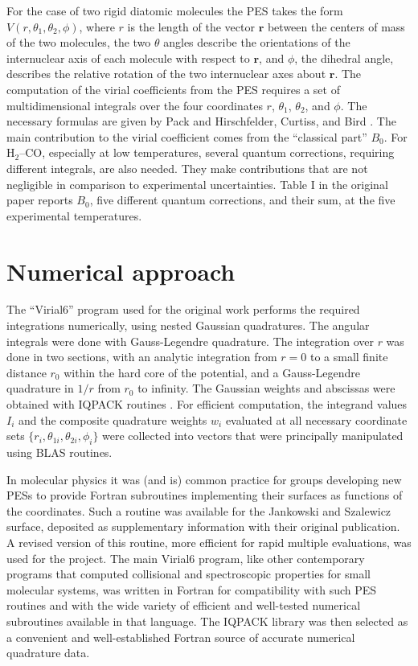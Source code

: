 For the case of two rigid diatomic molecules the PES takes the form $V(r,\theta_1, \theta_2, \phi)$, where $r$ is the length of the vector $\mathbf{r}$ between the centers of mass of the two molecules, the two $\theta$ angles describe the orientations of the internuclear axis of each molecule with respect to $\mathbf{r}$, and $\phi$, the dihedral angle, describes the relative rotation of the two internuclear axes about $\mathbf{r}$.  The computation of the virial coefficients from the PES requires a set of multidimensional integrals over the four coordinates $r$, $\theta_1$, $\theta_2$, and $\phi$.  The necessary formulas are given by Pack \cite{pack83} and Hirschfelder, Curtiss, and Bird \cite{hirs54}.  The main contribution to the virial coefficient comes from the ``classical part'' $B_0$.  For  H$_2$--CO, especially at low temperatures, several quantum corrections, requiring different integrals, are also needed.  They make contributions that are not negligible in comparison to experimental uncertainties.  Table I in the original paper reports $B_0$, five different quantum corrections, and their sum, at the five experimental temperatures.

\section{Numerical approach}
The ``Virial6'' program used for the original work performs the required integrations numerically, using nested Gaussian quadratures.  The angular integrals were done with Gauss-Legendre quadrature.  The integration over $r$ was done in two sections, with an analytic integration from $r=0$ to a small finite distance $r_0$ within the hard core of the potential, and a Gauss-Legendre quadrature in $1/r$ from $r_0$ to infinity.  The Gaussian weights and abscissas were obtained with IQPACK routines \cite{elha87}.  For efficient computation, the integrand values $I_i$ and the composite quadrature weights $w_i$ evaluated at all necessary coordinate sets $\{r_i,\theta_{1i}, \theta_{2i}, \phi_i\}$ were collected into vectors that were principally manipulated using BLAS routines.

In molecular physics it was (and is) common practice for groups developing new PESs to provide Fortran subroutines implementing their surfaces as functions of the coordinates.  Such a routine was available for the Jankowski and Szalewicz surface, deposited as supplementary information with their original publication.  A revised version of this routine, more efficient for rapid multiple evaluations, was used for the project.  The main Virial6 program, like other contemporary programs that computed collisional and spectroscopic properties for small molecular systems, was written in Fortran for compatibility with such PES routines and with the wide variety of efficient and well-tested numerical subroutines available in that language.  The IQPACK library was then selected as a convenient and well-established Fortran source of accurate numerical quadrature data.


